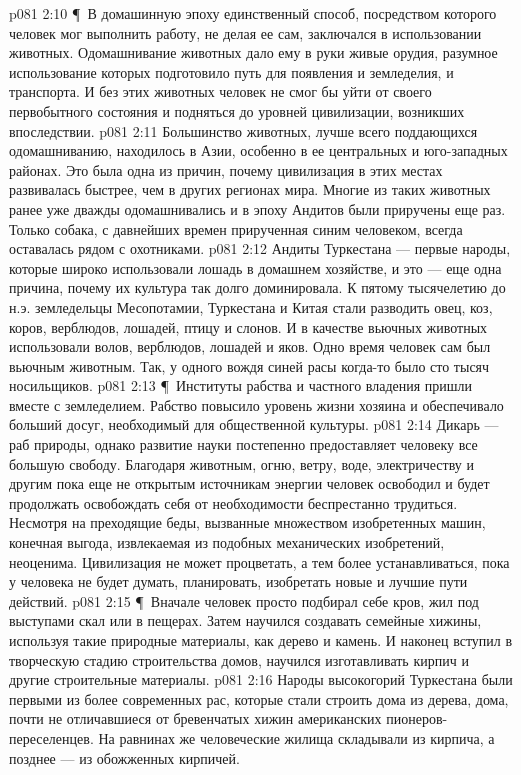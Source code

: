 \vs p081 2:10 \P\ В домашинную эпоху единственный способ, посредством которого человек мог выполнить работу, не делая ее сам, заключался в использовании животных. Одомашнивание животных дало ему в руки живые орудия, разумное использование которых подготовило путь для появления и земледелия, и транспорта. И без этих животных человек не смог бы уйти от своего первобытного состояния и подняться до уровней цивилизации, возникших впоследствии.
\vs p081 2:11 Большинство животных, лучше всего поддающихся одомашниванию, находилось в Азии, особенно в ее центральных и юго\hyp{}западных районах. Это была одна из причин, почему цивилизация в этих местах развивалась быстрее, чем в других регионах мира. Многие из таких животных ранее уже дважды одомашнивались и в эпоху Андитов были приручены еще раз. Только собака, с давнейших времен прирученная синим человеком, всегда оставалась рядом с охотниками.
\vs p081 2:12 Андиты Туркестана --- первые народы, которые широко использовали лошадь в домашнем хозяйстве, и это --- еще одна причина, почему их культура так долго доминировала. К пятому тысячелетию до н.э. земледельцы Месопотамии, Туркестана и Китая стали разводить овец, коз, коров, верблюдов, лошадей, птицу и слонов. И в качестве вьючных животных использовали волов, верблюдов, лошадей и яков. Одно время человек сам был вьючным животным. Так, у одного вождя синей расы когда\hyp{}то было сто тысяч носильщиков.
\vs p081 2:13 \P\ Институты рабства и частного владения пришли вместе с земледелием. Рабство повысило уровень жизни хозяина и обеспечивало больший досуг, необходимый для общественной культуры.
\vs p081 2:14 Дикарь --- раб природы, однако развитие науки постепенно предоставляет человеку все большую свободу. Благодаря животным, огню, ветру, воде, электричеству и другим пока еще не открытым источникам энергии человек освободил и будет продолжать освобождать себя от необходимости беспрестанно трудиться. Несмотря на преходящие беды, вызванные множеством изобретенных машин, конечная выгода, извлекаемая из подобных механических изобретений, неоценима. Цивилизация не может процветать, а тем более устанавливаться, пока у человека не будет  думать, планировать, изобретать новые и лучшие пути действий.
\vs p081 2:15 \P\ Вначале человек просто подбирал себе кров, жил под выступами скал или в пещерах. Затем научился создавать семейные хижины, используя такие природные материалы, как дерево и камень. И наконец вступил в творческую стадию строительства домов, научился изготавливать кирпич и другие строительные материалы.
\vs p081 2:16 Народы высокогорий Туркестана были первыми из более современных рас, которые стали строить дома из дерева, дома, почти не отличавшиеся от бревенчатых хижин американских пионеров\hyp{}переселенцев. На равнинах же человеческие жилища складывали из кирпича, а позднее --- из обожженных кирпичей.
